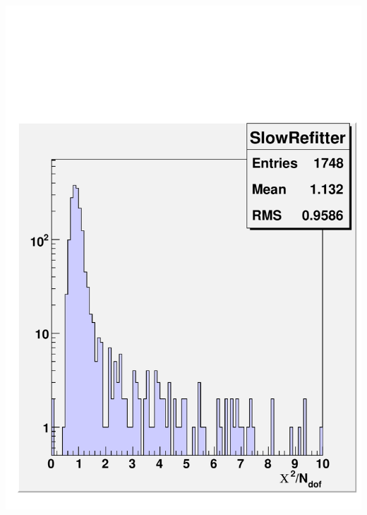 \documentclass[compress]{beamer}
\begin{document}
\begin{frame}
\begin{columns}
\includegraphics[width=\linewidth]{chi2_slow.pdf}
\end{columns}

\end{frame}
\end{document}
